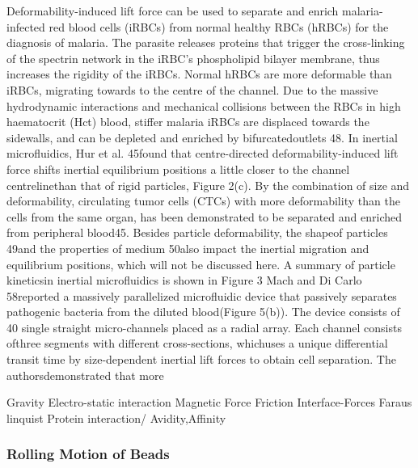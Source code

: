 Deformability-induced  lift  force  can  be  used  to  separate  and  enrich  malaria-infected  red blood  cells  (iRBCs)  from  normal  healthy  RBCs  (hRBCs)  for  the  diagnosis  of  malaria.  The parasite releases proteins that trigger the cross-linking of the spectrin network in the iRBC’s phospholipid bilayer membrane, thus increases the rigidity of the iRBCs. Normal hRBCs are more  deformable  than iRBCs,  migrating  towards  to  the  centre  of  the  channel.  Due  to  the massive  hydrodynamic  interactions  and  mechanical  collisions  between  the  RBCs  in  high haematocrit  (Hct)  blood,  stiffer  malaria iRBCs  are  displaced  towards  the  sidewalls,  and  can be depleted and enriched by bifurcatedoutlets 48. In  inertial  microfluidics,  Hur  et  al. 45found  that  centre-directed  deformability-induced  lift force shifts inertial equilibrium positions a little closer to the  channel centrelinethan that of rigid  particles,  Figure 2(c).  By  the  combination  of  size  and  deformability,  circulating  tumor cells  (CTCs)  with  more  deformability  than  the  cells  from  the  same  organ,  has  been demonstrated to be separated and enriched from peripheral blood45. Besides particle deformability, the shapeof particles 49and the properties of medium 50also impact  the  inertial  migration  and  equilibrium  positions,  which  will  not  be discussed here. A summary of particle kineticsin inertial microfluidics is shown in Figure 3
Mach  and  Di  Carlo 58reported  a  massively  parallelized  microfluidic  device  that  passively separates pathogenic bacteria from the diluted blood(Figure 5(b)). The device consists of 40 single straight  micro-channels  placed  as  a  radial  array.  Each  channel  consists  ofthree segments  with different  cross-sections, whichuses a unique differential transit time by  size-dependent  inertial  lift  forces  to  obtain  cell  separation. The  authorsdemonstrated  that more


Gravity
Electro-static interaction
Magnetic Force
Friction
Interface-Forces
Faraus linquist
Protein interaction/ Avidity,Affinity
\subsubsection{Rolling Motion of Beads}
\clearpage
\subsection{}
\clearpage
